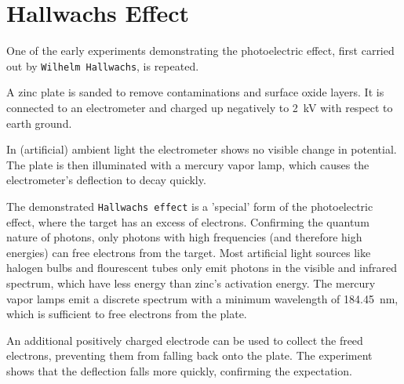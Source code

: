 \chapter{Hallwachs Effect}

One of the early experiments demonstrating the photoelectric effect, first carried out by \texttt{Wilhelm Hallwachs}, is repeated.

A zinc plate is sanded to remove contaminations and surface oxide layers.
It is connected to an electrometer and charged up negatively to \SI{2}{\kV} with respect to earth ground.

In (artificial) ambient light the electrometer shows no visible change in potential.
The plate is then illuminated with a mercury vapor lamp, which causes the electrometer's deflection to decay quickly.

The demonstrated \texttt{Hallwachs effect} is a 'special' form of the photoelectric effect, where the target has an excess of electrons.
Confirming the quantum nature of photons, only photons with high frequencies (and therefore high energies) can free electrons from the target.
Most artificial light sources like halogen bulbs and flourescent tubes only emit photons in the visible and infrared spectrum, which have less energy than zinc's activation energy.
The mercury vapor lamps emit a discrete spectrum with a minimum wavelength of \SI{184.45}{\nm}, which is sufficient to free electrons from the plate.

An additional positively charged electrode can be used to collect the freed electrons, preventing them from falling back onto the plate.
The experiment shows that the deflection falls more quickly, confirming the expectation.
